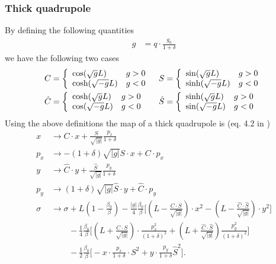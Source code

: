 \documentclass[english]{article}
\begin{document}
\subsubsection{Thick quadrupole}
\noindent By defining the following quantities
\begin{align}
  g &= q \cdot \frac{g_0}{1+\delta}
\end{align}
we have the following two cases
\begin{align}
    C &= \left\{
         \begin{array}{l l}
             \cos(\sqrt{g}L)  & g > 0 \\
             \cosh(\sqrt{-g}L) & g < 0
         \end{array}
         \right. &
    S &= \left\{
         \begin{array}{l l}
             \sin(\sqrt{g}L)  & g > 0 \\
             \sinh(\sqrt{-g}L) & g < 0
         \end{array}
         \right. \\
    \hat{C} &= \left\{
         \begin{array}{l l}
             \cosh(\sqrt{g}L)  & g > 0 \\
             \cos(\sqrt{-g}L) & g < 0
         \end{array}
         \right. &
    \hat{S} &= \left\{
         \begin{array}{l l}
             \sinh(\sqrt{g}L)  & g > 0 \\
             \sin(\sqrt{-g}L) & g < 0
         \end{array}
         \right.
\end{align}
Using the above definitions the map of a thick quadrupole is (eq. 4.2 in \cite{barber87})
\begin{align}
  x   &\to C \cdot x + \frac{S}{\sqrt{|g|}} \frac{p_x}{1+\delta} \\
  p_x &\to - (1+\delta) \sqrt{|g|} S \cdot x + C \cdot p_x \\
  y   &\to \hat C \cdot y + \frac{\hat S}{\sqrt{|g|}} \frac{p_y}{1+\delta} \\
  p_y &\to (1+\delta)\sqrt{|g|} \hat S \cdot y + \hat C \cdot p_y \\
  \sigma &\to \sigma + L \left(1 - \frac{\beta_0}{\beta} \right)
  - \frac{|g|}{4} \frac{\beta_0}{\beta} \Bigg[\left(L-\frac{C\cdot S}{\sqrt{|g|}} \right) \cdot x^2
  - \left(L-\frac{\hat{C}\cdot\hat{S}}{\sqrt{|g|}} \right) \cdot y^2 \Bigg] \\
  & \,\qquad- \frac{1}{4}\frac{\beta_0}{\beta} \Bigg[ \left(L
  + \frac{C\cdot S}{\sqrt{|g|}}\right) \cdot \frac{p_x^2}{(1+\delta)^2}
  + \left(L + \frac{\hat{C}\cdot\hat{S}}{\sqrt{|g|}} \right) \frac{p_y^2}{(1+\delta)^2} \Bigg] \\
  & \,\qquad- \frac{1}{2}\frac{\beta_0}{\beta}\Bigg[-x\cdot\frac{p_x}{1+\delta} \cdot S^2 
  + y\cdot\frac{p_y}{1+\delta} \hat{S}^2 \Bigg].
\end{align}
\end{document}

